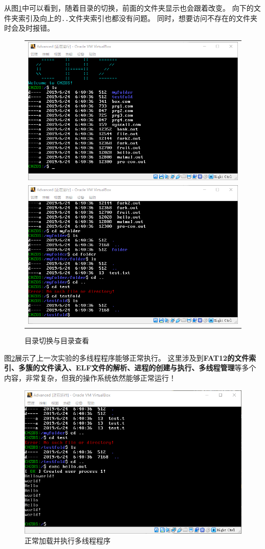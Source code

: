 \documentclass[logo,reportComp]{thesis}
\begin{document}
从图\ref{fig:dir}中可以看到，随着目录的切换，前面的文件夹显示也会跟着改变。
向下的文件夹索引及向上的\verb'..'文件夹索引也都没有问题。
同时，想要访问不存在的文件夹时会及时报错。
\begin{figure}[H]
\centering
\begin{tabular}{c}
\includegraphics[width=0.8\linewidth]{fig/ls1.png}\\
\includegraphics[width=0.8\linewidth]{fig/ls2.png}
\end{tabular}
\caption{目录切换与目录查看}
\label{fig:dir}
\end{figure}

图\ref{fig:hello}展示了上一次实验的多线程程序能够正常执行。
这里涉及到\textbf{FAT12的文件索引、多簇的文件读入、ELF文件的解析、进程的创建与执行、多线程管理}等多个内容，非常复杂，但我的操作系统依然能够正常运行！
\begin{figure}[H]
\centering
\includegraphics[width=0.8\linewidth]{fig/exec.png}
\caption{正常加载并执行多线程程序}
\label{fig:hello}
\end{figure}
\end{document}
